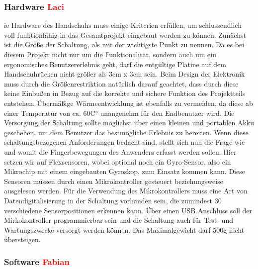 \documentclass[11pt]{article}
\begin{document}
\subsubsection{Hardware \textcolor{red}{Laci}}
ie Hardware des Handschuhs muss einige Kriterien erfüllen, um schlussendlich voll funktionfähig in das Gesamtprojekt eingebaut 
werden zu können. Zunächst ist die Größe der Schaltung, als mit der wichtigste Punkt zu nennen. Da es bei diesem Projekt nicht nur
um die Funktionalität, sondern auch um ein ergonomisches Benutzererlebnis geht, darf die entgültige Platine auf dem Handschuhrücken
nicht größer als 3cm x 3cm sein. Beim Design der Elektronik muss durch die Größenrestriktion natürlich darauf geachtet, dass durch
diese keine Einbußen in Bezug auf die korrekte und sichere Funktion des Projektteils entstehen. Übermäßige Wärmeentwicklung ist 
ebenfalls zu vermeiden, da diese ab einer Temperatur von ca. 60C° unangenehm für den Endbenutzer wird. Die Versorgung der Schaltung
sollte möglichst über einen kleinen und portablen Akku geschehen, um dem Benutzer das bestmögliche Erlebnis zu bereiten. Wenn diese
schaltungsbezogenen Anforderungen bedacht sind, stellt sich nun die Frage wie und womit die Fingerbewegungen des Anwenders erfasst 
werden sollen. Hier setzen wir auf Flexsensoren, wobei optional noch ein Gyro-Sensor, also ein Mikrochip mit einem eingebauten
Gyroskop, zum Einsatz kommen kann. Diese Sensoren müssen durch einen Mikrokontroller gesteuert beziehungsweise ausgelesen werden.
Für die Verwendung des Mikrokontrollers muss eine Art von Datendigitalisierung in der Schaltung vorhanden sein, die zumindest 30
verschiedene Sensorpositionen erkennen kann. Über einen USB Anschluss soll der Mirkokontroller programmierbar sein und die Schaltung
auch für Test -und Wartungszwecke versorgt werden können. Das Maximalgewicht darf 500g nicht übersteigen. \\

\subsubsection{Software \textcolor{red}{Fabian}}
\end{document}
